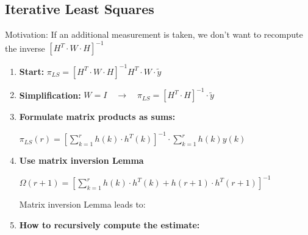\documentclass[10pt,a4paper]{scrartcl}
\begin{document}
\begin{multicols*}{3}
\subsection{Iterative Least Squares}


Motivation: If an additional measurement is taken, we don't want to recompute the inverse $[H^T\cdot W\cdot H]^{-1}$ 


\begin{enumerate}
\ncompaq
\item \textbf{Start:} $\pi_{LS}=[H^T\cdot W\cdot H]^{-1}H^T\cdot W\cdot \tilde{y}$
\item \textbf{Simplification:} $W=I\quad\rightarrow\quad \pi_{LS}=[H^T\cdot H]^{-1}\cdot\tilde{y}$
\item \textbf{Formulate matrix products as sums:}

$\pi_{LS}(r)=\left[\sum\limits_{k=1}^rh(k)\cdot h^T(k)\right]^{-1}\cdot \sum\limits_{k=1}^rh(k)y(k)$
\item \textbf{Use matrix inversion Lemma}


$\Omega(r+1)=\left[\sum\limits_{k=1}^rh(k)\cdot h^T(k)+h(r+1)\cdot h^T(r+1)\right]^{-1}$

\dahe Matrix inversion Lemma leads to:

\item \textbf{How to recursively compute the estimate:}




\end{enumerate}
\end{multicols*}
\end{document}
